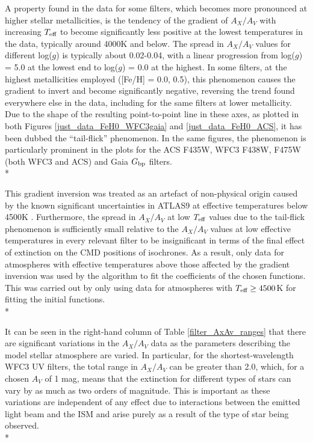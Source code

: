 \documentclass[12pt, a4paper]{report}
\begin{document}
A property found in the data for some filters, which becomes more pronounced at higher stellar metallicities, is the tendency of the gradient of $A_{X}/A_{V}$ with increasing $T_{\textnormal{eff}}$ to become significantly less positive at the lowest temperatures in the data, typically around 4000K and below. The spread in $A_{X}/A_{V}$ values for different log($g$) is typically about 0.02-0.04, with a linear progression from log($g$) = 5.0 at the lowest end to log($g$) = 0.0 at the highest. In some filters, at the highest metallicities employed ([Fe/H] = 0.0, 0.5), this phenomenon causes the gradient to invert and become significantly negative, reversing the trend found everywhere else in the data, including for the same filters at lower metallicity. Due to the shape of the resulting point-to-point line in these axes, as plotted in both Figures \ref{just_data_FeH0_WFC3gaia} and \ref{just_data_FeH0_ACS}, it has been dubbed the ``tail-flick'' phenomenon. In the same figures, the phenomenon is particularly prominent in the plots for the ACS F435W, WFC3 F438W, F475W (both WFC3 and ACS) and Gaia $G_{\textnormal{bp}}$ filters.\\*

This gradient inversion was treated as an artefact of non-physical origin caused by the known significant uncertainties in ATLAS9 at effective temperatures below 4500K \citep{2004astro.ph..5087C,2008PASP..120..583G}. Furthermore, the spread in $A_{X}/A_{V}$ at low $T_{\textnormal{eff}}$ values due to the tail-flick phenomenon is sufficiently small relative to the $A_{X}/A_{V}$ values at low effective temperatures in every relevant filter to be insignificant in terms of the final effect of extinction on the CMD positions of isochrones. As a result, only data for atmospheres with effective temperatures above those affected by the gradient inversion was used by the algorithm to fit the coefficients of the chosen functions. This was carried out by only using data for atmospheres with $T_{\textnormal{eff}} \geq 4500$K for fitting the initial functions.\\*

It can be seen in the right-hand column of Table \ref{filter_AxAv_ranges} that there are significant variations in the $A_{X}/A_{V}$ data as the parameters describing the model stellar atmosphere are varied. In particular, for the shortest-wavelength WFC3 UV filters, the total range in $A_{X}/A_{V}$ can be greater than 2.0, which, for a chosen $A_{V}$ of 1 mag, means that the extinction for different types of stars can vary by as much as two orders of magnitude. 
This is important as these variations are independent of any effect due to interactions between the emitted light beam and the ISM and arise purely as a result of the type of star being observed. \\*
\end{document}
